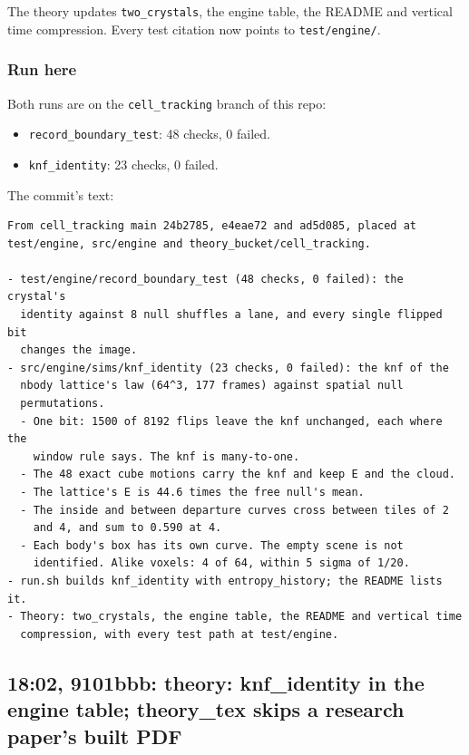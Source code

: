 The theory updates \texttt{two\_\allowbreak{}crystals}, the engine table, the README and vertical time compression. Every test citation now points to \texttt{test/\allowbreak{}engine/\allowbreak{}}.

\subsubsection{\texorpdfstring{Run here}{Run here}}

Both runs are on the \texttt{cell\_\allowbreak{}tracking} branch of this repo:

\begin{itemize}
\item \texttt{record\_\allowbreak{}boundary\_\allowbreak{}test}: 48 checks, 0 failed.
\item \texttt{knf\_\allowbreak{}identity}: 23 checks, 0 failed.
\end{itemize}

The commit's text:

\begin{Verbatim}
From cell_tracking main 24b2785, e4eae72 and ad5d085, placed at
test/engine, src/engine and theory_bucket/cell_tracking.

- test/engine/record_boundary_test (48 checks, 0 failed): the crystal's
  identity against 8 null shuffles a lane, and every single flipped bit
  changes the image.
- src/engine/sims/knf_identity (23 checks, 0 failed): the knf of the
  nbody lattice's law (64^3, 177 frames) against spatial null
  permutations.
  - One bit: 1500 of 8192 flips leave the knf unchanged, each where the
    window rule says. The knf is many-to-one.
  - The 48 exact cube motions carry the knf and keep E and the cloud.
  - The lattice's E is 44.6 times the free null's mean.
  - The inside and between departure curves cross between tiles of 2
    and 4, and sum to 0.590 at 4.
  - Each body's box has its own curve. The empty scene is not
    identified. Alike voxels: 4 of 64, within 5 sigma of 1/20.
- run.sh builds knf_identity with entropy_history; the README lists it.
- Theory: two_crystals, the engine table, the README and vertical time
  compression, with every test path at test/engine.
\end{Verbatim}

\subsection{\texorpdfstring{18:02, 9101bbb: theory: knf\_\allowbreak{}identity in the engine table; theory\_\allowbreak{}tex skips a research paper's built PDF}{18:02, 9101bbb: theory: knf\_identity in the engine table; theory\_tex skips a research paper's built PDF}}

